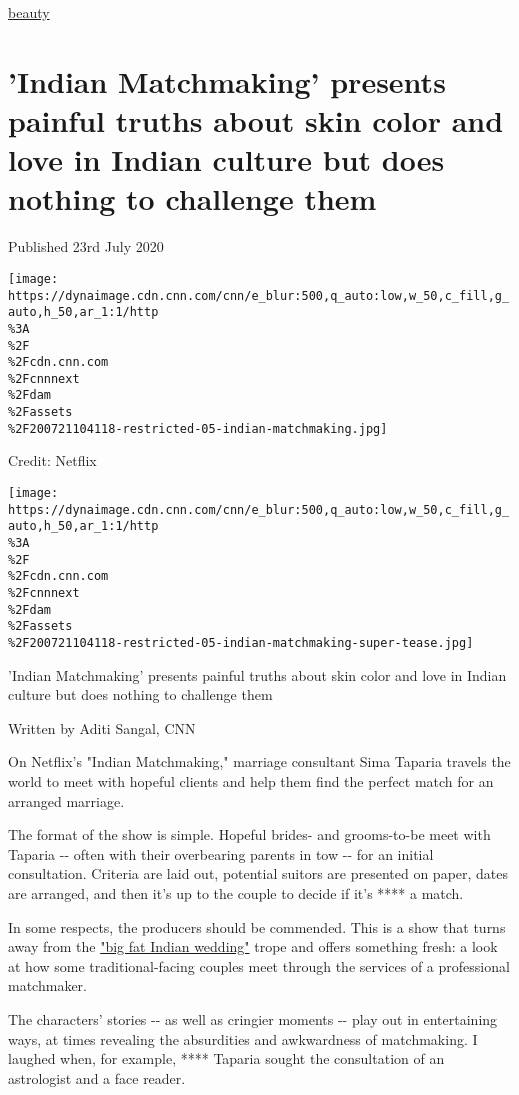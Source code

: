 \href{/}{}\href{/style}{}

\href{/style/beauty}{beauty}

\hypertarget{indian-matchmaking-presents-painful-truths-about-skin-color-and-love-in-indian-culture-but-does-nothing-to-challenge-them}{%
\section{'Indian Matchmaking' presents painful truths about skin color
and love in Indian culture but does nothing to challenge
them}\label{indian-matchmaking-presents-painful-truths-about-skin-color-and-love-in-indian-culture-but-does-nothing-to-challenge-them}}

Published 23rd July 2020

\texttt{[image: https://dynaimage.cdn.cnn.com/cnn/e\_blur:500,q\_auto:low,w\_50,c\_fill,g\_auto,h\_50,ar\_1:1/http\\\%3A\\\%2F\\\%2Fcdn.cnn.com\\\%2Fcnnnext\\\%2Fdam\\\%2Fassets\\\%2F200721104118-restricted-05-indian-matchmaking.jpg]}

Credit: Netflix

\texttt{[image: https://dynaimage.cdn.cnn.com/cnn/e\_blur:500,q\_auto:low,w\_50,c\_fill,g\_auto,h\_50,ar\_1:1/http\\\%3A\\\%2F\\\%2Fcdn.cnn.com\\\%2Fcnnnext\\\%2Fdam\\\%2Fassets\\\%2F200721104118-restricted-05-indian-matchmaking-super-tease.jpg]}

'Indian Matchmaking' presents painful truths about skin color and love
in Indian culture but does nothing to challenge them

Written by Aditi Sangal, CNN

On Netflix's "Indian Matchmaking," marriage consultant Sima Taparia
travels the world to meet with hopeful clients and help them find the
perfect match for an arranged marriage.

The format of the show is simple. Hopeful brides- and grooms-to-be meet
with Taparia -\/- often with their overbearing parents in tow -\/- for
an initial consultation. Criteria are laid out, potential suitors are
presented on paper, dates are arranged, and then it's up to the couple
to decide if it's **** a match.

In some respects, the producers should be commended. This is a show that
turns away from the
\href{https://edition.cnn.com/style/article/india-wedding-culture/index.html}{"big
fat Indian wedding"} trope and offers something fresh: a look at how
some traditional-facing couples meet through the services of a
professional matchmaker.

The characters' stories -\/- as well as cringier moments -\/- play out
in entertaining ways, at times revealing the absurdities and awkwardness
of matchmaking. I laughed when, for example, **** Taparia sought the
consultation of an astrologist and a face reader.

